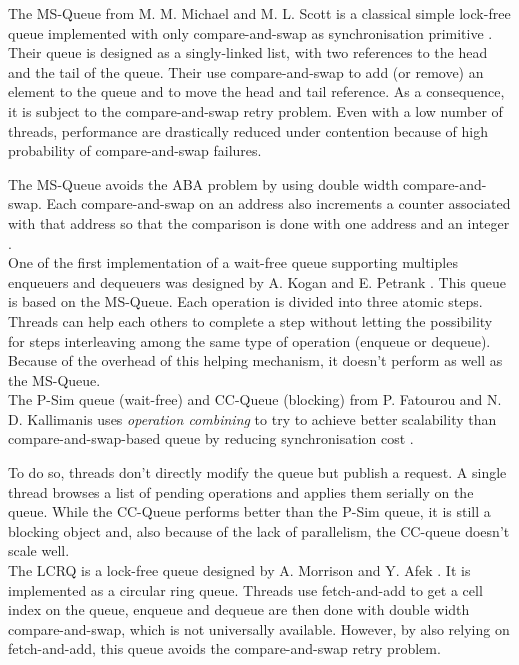  The MS-Queue from M. M. Michael and M. L. Scott is a classical
simple lock-free queue implemented with only compare-and-swap as synchronisation
primitive \cite{Michael96simple}. Their queue is designed as a singly-linked
list, with two references to the head and the tail of the queue. Their use
compare-and-swap to add (or remove) an element to the queue and to move the head
and tail reference. As a consequence, it is subject to the compare-and-swap
retry problem. Even with a low number of threads, performance are drastically
reduced under contention because of high probability of compare-and-swap
failures.

The MS-Queue avoids the ABA problem by using double width compare-and-swap. Each
compare-and-swap on an address also increments a counter associated with that
address so that the comparison is done with one address and an integer
\cite{Herlihy08} \cite{Michael96simple}. \\

 One of the first implementation of a wait-free
queue supporting multiples enqueuers and dequeuers was designed by A. Kogan and
E. Petrank \cite{Kogan:2011:WQM:2038037.1941585}. This queue is based on the
MS-Queue. Each operation is divided into three atomic steps. Threads can help
each others to complete a step without letting the possibility for steps
interleaving among the same type of operation (enqueue or dequeue). Because of
the overhead of this helping mechanism, it doesn't perform as well as the
MS-Queue. \\

 The P-Sim queue (wait-free) and CC-Queue (blocking)
from P. Fatourou and N. D. Kallimanis uses \textit{operation combining} to try
to achieve better scalability than compare-and-swap-based queue by reducing
synchronisation cost \cite{Fatourou:2011:HWU:1989493.1989549}
\cite{Fatourou:2012:RCS:2370036.2145849}.

To do so, threads don't directly modify the queue but publish a request. A
single thread browses a list of pending operations and applies them serially on
the queue. While the CC-Queue performs better than the P-Sim queue, it is still
a blocking object and, also because of the lack of parallelism, the CC-queue
doesn't scale well. \\

 The LCRQ is a lock-free queue designed by A. Morrison
and Y. Afek \cite{Morrison:2013:FCQ:2517327.2442527}. It is implemented as a
circular ring queue. Threads use fetch-and-add to get a cell index on the queue,
enqueue and dequeue are then done with double width compare-and-swap, which is
not universally available. However, by also relying on fetch-and-add, this queue
avoids the compare-and-swap retry problem. \\

